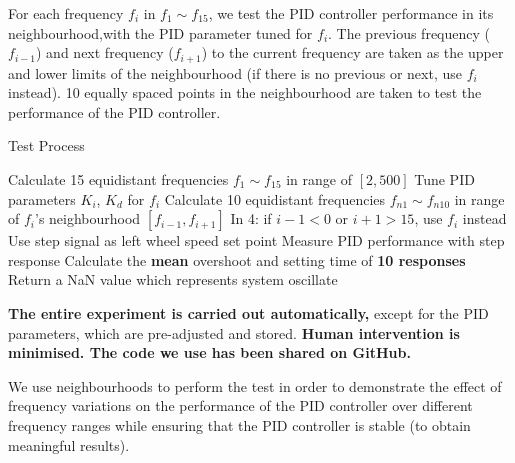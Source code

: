 \documentclass[conference]{IEEEtran}
\begin{document}

For each frequency $f_{i}$ in $f_{1}\sim f_{15}$, we test the PID controller performance in its neighbourhood,with the PID parameter tuned for $f_{i}$. The previous frequency ($f_{i-1}$) and next frequency ($f_{i+1}$) to the current frequency are taken as the upper and lower limits of the neighbourhood (if there is no previous or next, use $f_{i}$ instead). 10 equally spaced points in the neighbourhood are taken to test the performance of the PID controller.

\begin{algorithm}
	\caption{Test Process}\label{TestMethod}
	\begin{algorithmic}[1]
        \State Calculate 15  equidistant frequencies $f_{1}\sim f_{15}$ in range of $[2,500]$
                \State Tune PID parameters $K_{i}$, $K_{d}$ for $f_{i}$
                \State Calculate 10 equidistant frequencies $f_{n1}\sim f_{n10}$ in range of $f_{i}$'s neighbourhood $[f_{i-1},f_{i+1}]$
                \State In 4: if $i-1<0$ or $i+1>15$, use $f_{i}$ instead
				\State Use step signal as left wheel speed set point
                \State Measure PID performance with step response
                \State Calculate the \textbf{mean} overshoot and setting time of \textbf{10 responses}
                 Return a NaN value which represents system oscillate        
                \EndIf
			\EndFor
		\EndFor
	\end{algorithmic} 
\end{algorithm}

 \textbf{The entire experiment is carried out automatically,} except for the PID parameters, which are pre-adjusted and stored. \textbf{Human intervention is minimised. The code we use has been shared on GitHub.} 
 
We use neighbourhoods to perform the test in order to demonstrate the effect of frequency variations on the performance of the PID controller over different frequency ranges while ensuring that the PID controller is stable (to obtain meaningful results).
\end{document}
